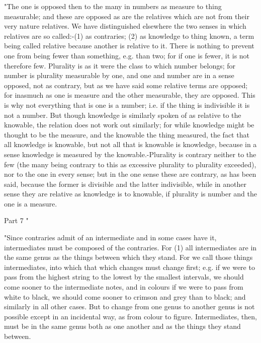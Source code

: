 "The one is opposed then to the many in numbers as measure to thing
measurable; and these are opposed as are the relatives which are not
from their very nature relatives. We have distinguished elsewhere
the two senses in which relatives are so called:-(1) as contraries;
(2) as knowledge to thing known, a term being called relative because
another is relative to it. There is nothing to prevent one from being
fewer than something, e.g. than two; for if one is fewer, it is not
therefore few. Plurality is as it were the class to which number belongs;
for number is plurality measurable by one, and one and number are
in a sense opposed, not as contrary, but as we have said some relative
terms are opposed; for inasmuch as one is measure and the other measurable,
they are opposed. This is why not everything that is one is a number;
i.e. if the thing is indivisible it is not a number. But though knowledge
is similarly spoken of as relative to the knowable, the relation does
not work out similarly; for while knowledge might be thought to be
the measure, and the knowable the thing measured, the fact that all
knowledge is knowable, but not all that is knowable is knowledge,
because in a sense knowledge is measured by the knowable.-Plurality
is contrary neither to the few (the many being contrary to this as
excessive plurality to plurality exceeded), nor to the one in every
sense; but in the one sense these are contrary, as has been said,
because the former is divisible and the latter indivisible, while
in another sense they are relative as knowledge is to knowable, if
plurality is number and the one is a measure. 

Part 7 "

"Since contraries admit of an intermediate and in some cases have
it, intermediates must be composed of the contraries. For (1) all
intermediates are in the same genus as the things between which they
stand. For we call those things intermediates, into which that which
changes must change first; e.g. if we were to pass from the highest
string to the lowest by the smallest intervals, we should come sooner
to the intermediate notes, and in colours if we were to pass from
white to black, we should come sooner to crimson and grey than to
black; and similarly in all other cases. But to change from one genus
to another genus is not possible except in an incidental way, as from
colour to figure. Intermediates, then, must be in the same genus both
as one another and as the things they stand between. 

